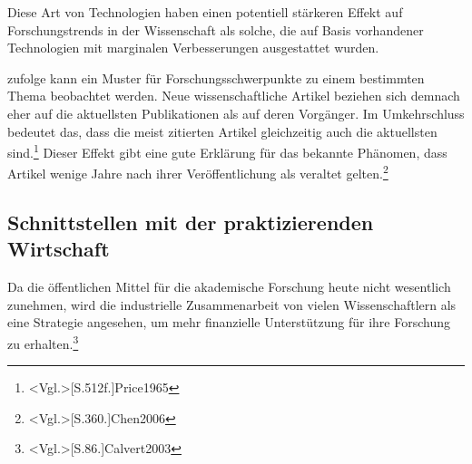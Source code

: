 Diese Art von Technologien haben einen potentiell stärkeren Effekt auf Forschungstrends in der Wissenschaft als solche, die auf Basis vorhandener Technologien mit marginalen Verbesserungen ausgestattet wurden.

 zufolge kann ein Muster für Forschungsschwerpunkte zu einem bestimmten Thema beobachtet werden. Neue wissenschaftliche Artikel beziehen sich demnach eher auf die aktuellsten Publikationen als auf deren Vorgänger. Im Umkehrschluss bedeutet das, dass die meist zitierten Artikel gleichzeitig auch die aktuellsten sind.\footnote{\citeNP<Vgl.>[S.512f.]{Price1965}} Dieser Effekt gibt eine gute Erklärung für das bekannte Phänomen, dass Artikel wenige Jahre nach ihrer Veröffentlichung als veraltet gelten.\footnote{\citeNP<Vgl.>[S.360.]{Chen2006}}

\subsection{Schnittstellen mit der praktizierenden Wirtschaft}
Da die öffentlichen Mittel für die akademische Forschung heute nicht wesentlich zunehmen, wird die industrielle Zusammenarbeit von vielen Wissenschaftlern als eine Strategie angesehen, um mehr finanzielle Unterstützung für ihre Forschung zu erhalten.\footnote{\citeNP<Vgl.>[S.86.]{Calvert2003}}